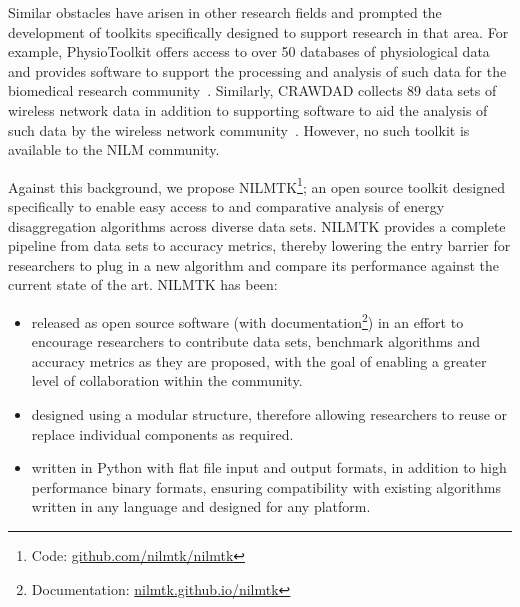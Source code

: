 \documentclass{sig-alternate}
\begin{document}
Similar obstacles have arisen in other research fields and prompted the development of toolkits specifically designed to support research in that area. For example, PhysioToolkit offers access to over 50 databases of physiological data and provides software to support the processing and analysis of such data for the biomedical research community~\cite{physionet}. Similarly, CRAWDAD collects 89 data sets of wireless network data in addition to supporting software to aid the analysis of such data by the wireless network community~\cite{crawdad}. However, no such toolkit is available to the NILM community.

Against this background, we propose NILMTK\footnote{Code: \url{github.com/nilmtk/nilmtk}}; an open source toolkit designed specifically to enable easy access to and comparative analysis of energy disaggregation algorithms across diverse data sets. NILMTK provides a complete pipeline from data sets to accuracy metrics, thereby lowering the entry barrier for researchers to plug in a new algorithm and compare its performance against the current state of the art. NILMTK has been:
\begin{itemize}
\item released as open source software (with documentation\footnote{Documentation: \url{nilmtk.github.io/nilmtk}}) in an effort to encourage researchers to contribute data sets, benchmark algorithms and accuracy metrics as they are proposed, with the goal of enabling a greater level of collaboration within the community. 
\item designed using a modular structure, therefore allowing researchers to reuse or replace individual components as required. 
\item written in Python with flat file input and output formats, in addition to high performance binary formats, ensuring compatibility with existing algorithms written in any language and designed for any platform.
\end{itemize}
\end{document}

